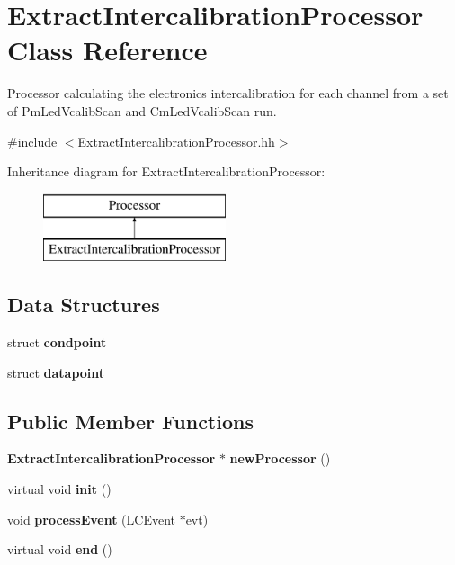 \section{Extract\-Intercalibration\-Processor Class Reference}
\label{classExtractIntercalibrationProcessor}


Processor calculating the electronics intercalibration for each channel from a set of Pm\-Led\-Vcalib\-Scan and Cm\-Led\-Vcalib\-Scan run.  




{\ttfamily \#include $<$Extract\-Intercalibration\-Processor.\-hh$>$}

Inheritance diagram for Extract\-Intercalibration\-Processor\-:\begin{figure}[H]
\begin{center}
\leavevmode
\includegraphics[height=2.000000cm]{classExtractIntercalibrationProcessor}
\end{center}
\end{figure}
\subsection*{Data Structures}
\begin{DoxyCompactItemize}
\item 
struct {\bf condpoint}
\item 
struct {\bf datapoint}
\end{DoxyCompactItemize}
\subsection*{Public Member Functions}
\begin{DoxyCompactItemize}
\item 
{\bf Extract\-Intercalibration\-Processor} $\ast$ {\bfseries new\-Processor} ()\label{classExtractIntercalibrationProcessor_af7b829330fe9a3a4700f2ff35d754c2f}

\item 
virtual void {\bfseries init} ()\label{classExtractIntercalibrationProcessor_a88dbc7b44c2dd7185efba4803f75fa6f}

\item 
void {\bfseries process\-Event} (L\-C\-Event $\ast$evt)\label{classExtractIntercalibrationProcessor_a8b9b3ce7a22525ea1fb8e56e780aa166}

\item 
virtual void {\bfseries end} ()\label{classExtractIntercalibrationProcessor_aa8cae07229f1d96ba57f17bd2aa9a9eb}

\end{DoxyCompactItemize}
